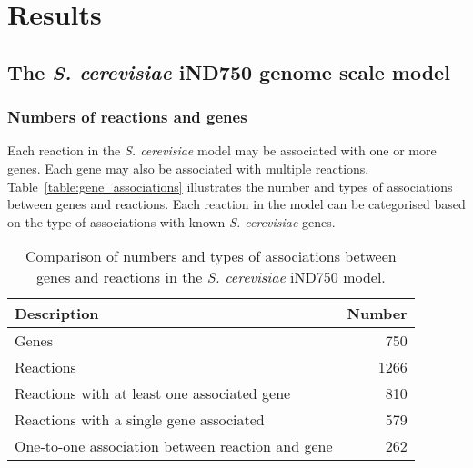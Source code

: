 
\clearpage

\section{Results}%

\subsection{The \emph{S. cerevisiae} iND750 genome scale model}%

\subsubsection{Numbers of reactions and genes}%

Each reaction in the \emph{S. cerevisiae} model may be associated with one or more genes. Each gene may also be associated with multiple reactions. Table~\vref{table:gene_associations} illustrates the number and types of associations between genes and reactions. Each reaction in the model can be categorised based on the type of associations with known \emph{S. cerevisiae} genes.

\begin{table}[b]%
  \centering
  \begin{tabular}{l r}
                                                                   \toprule
    Description                                      & Number   \\ \midrule
    Genes                                            & 750      \\
    Reactions                                        & 1266     \\
    Reactions with at least one associated gene      & 810      \\
    Reactions with a single gene associated          & 579      \\
    One-to-one association between reaction and gene & 262      \\ \bottomrule
  \end{tabular}
  \caption[Gene associations in the \emph{S. cerevisiae} iND750 model]{Comparison of numbers and types of associations between genes and reactions in the \emph{S. cerevisiae} iND750 model. }
  \label{table:gene_associations}
\end{table}%

